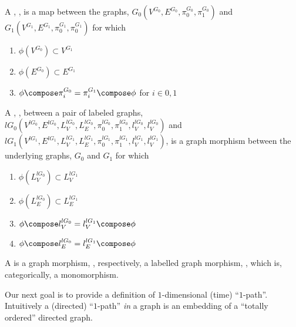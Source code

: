 \documentclass[a4paper,openany]{amsart}
\begin{document}
\begin{definition}
A , , is a map between the graphs,
$G_0(V^{G_0}, E^{G_0}, \pi^{G_0}_0, \pi^{G_0}_1)$ and $G_1(V^{G_1}, E^{G_1}, \pi^{G_1}_0,
\pi^{G_1}_0)$ for which

\begin{enumerate}

\item $\phi(V^{G_0}) \subset V^{G_1}$

\item $\phi(E^{G_0}) \subset E^{G_1}$

\item $\phi \compose \pi^{G_0}_i = \pi^{G_1}_i \compose \phi$ for $i \in {0, 1}$

\end{enumerate}

A , , between a pair of labeled
graphs, $lG_0(V^{lG_0}, E^{lG_0}, L^{lG_0}_V, L^{lG_0}_E, \pi^{lG_0}_0, \pi^{lG_0}_1,
l^{lG_0}_V, l^{lG_0}_V)$ and $lG_1(V^{lG_1}, E^{lG_1}, L^{lG_1}_V, L^{lG_1}_E,
\pi^{lG_1}_0, \pi^{lG_1}_1, l^{lG_1}_V, l^{lG_1}_V)$, is a graph morphism between the
underlying graphs, $G_0$ and $G_1$ for which

\begin{enumerate}

\item $\phi(L^{lG_0}_V) \subset L^{lG_1}_V$

\item $\phi(L^{lG_0}_E) \subset L^{lG_1}_E$

\item $\phi \compose l^{lG_0}_V = l^{lG_1}_V \compose \phi$

\item $\phi \compose l^{lG_0}_E = l^{lG_1}_E \compose \phi$

\end{enumerate}

\end{definition}

\begin{definition}
A  is a graph morphism, , respectively, a
labelled graph morphism, , which is, categorically, a monomorphism.
\end{definition}

Our next goal is to provide a definition of $1$-dimensional (time) ``$1$-path''.
Intuitively a (directed) ``$1$-path'' \emph{in} a graph is an embedding of a ``totally
ordered'' directed graph.
\end{document}
